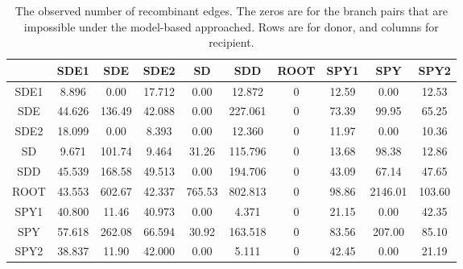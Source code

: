 \documentclass[10pt]{article}
\providecommand{\tabularnewline}{\\}
\begin{document}
\begin{table}
\caption{\label{tab:obsheatmap}The observed number of recombinant edges.
The zeros are for the branch pairs that are impossible under the model-based
approached. Rows are for donor, and columns for recipient.}
\noindent \centering{}\begin{tabular}{cccccccccc}
\hline
& SDE1 & SDE & SDE2 & SD & SDD & ROOT & SPY1 & SPY & SPY2 \tabularnewline
\hline
SDE1&8.896 &  0.00 &17.712  & 0.00 & 12.872   & 0 &12.59  &  0.00  &12.53\tabularnewline
SDE &44.626& 136.49& 42.088 &  0.00& 227.061  &  0& 73.39 &  99.95 & 65.25\tabularnewline
SDE2&18.099&   0.00&  8.393 &  0.00&  12.360  &  0& 11.97 &   0.00 & 10.36\tabularnewline
SD  &9.671 &101.74 & 9.464  &31.26 &115.796   & 0 &13.68  & 98.38  &12.86\tabularnewline
SDD &45.539& 168.58& 49.513 &  0.00& 194.706  &  0& 43.09 &  67.14 & 47.65\tabularnewline
ROOT&43.553& 602.67& 42.337 &765.53& 802.813  &  0& 98.86 &2146.01 &103.60\tabularnewline
SPY1&40.800&  11.46& 40.973 &  0.00&   4.371  &  0& 21.15 &   0.00 & 42.35\tabularnewline
SPY &57.618& 262.08& 66.594 & 30.92& 163.518  &  0& 83.56 & 207.00 & 85.10\tabularnewline
SPY2&38.837&  11.90& 42.000 &  0.00&   5.111  &  0& 42.45 &   0.00 & 21.19\tabularnewline
\hline
\end{tabular}
\end{table}
\end{document}
